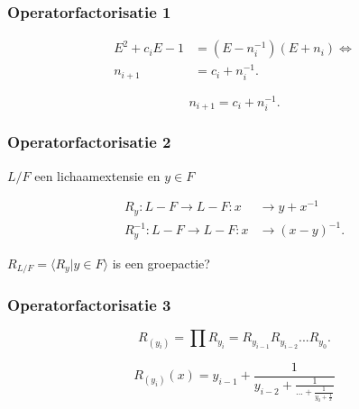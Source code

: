 \documentclass[20pt]{beamer}
\begin{document}


\begin{frame}
    \frametitle{Operatorfactorisatie 1}
    \begin{theorem}
        \vspace*{-0.5cm}
        \begin{align*}
            E^2 +c_i E -1 & = (E - n_i^{-1})(E + n_i) \Leftrightarrow \\
            n_{i+1}       & = c_i + n_i^{-1}.
        \end{align*}
    \end{theorem}
    \pause
    \begin{definition}
        $$
            n_{i+1} = c_i + n_i^{-1}.
        $$
    \end{definition}

\end{frame}

\begin{frame}
    \frametitle{Operatorfactorisatie 2}
    $L/F$ een lichaamextensie en $y \in F$ \pause
    \begin{definition}
        \vspace*{-0.85cm}
        \begin{align*}
            R_y: L-F \rightarrow L-F: x      & \rightarrow y + x^{-1}  \\
            R^{-1}_y: L-F \rightarrow L-F: x & \rightarrow (x-y)^{-1}.
        \end{align*}
    \end{definition}
    \pause
    \begin{conjecture}
        $R_{L/F}=\langle R_y | y \in F\rangle$ is een groepactie?
    \end{conjecture}

\end{frame}

\begin{frame}
    \frametitle{Operatorfactorisatie 3}
    \begin{definition}[$R_{(y_i)}$]
        \vspace*{-0.5cm}
        $$
            R_{(y_i)} = \prod{ R_{y_i}} = R_{y_{i-1}} R_{y_{i-2}} ... R_{y_0}.
        $$
    \end{definition} \vspace*{-1cm} \pause
    $$
    R_{(y_i)}(x) = y_{i-1}+\frac{1}{y_{i-2}+\frac{1}{...  +\frac{1}{y_{0}+\frac{1}{x}}}}
    $$

\end{frame}
\end{document}
